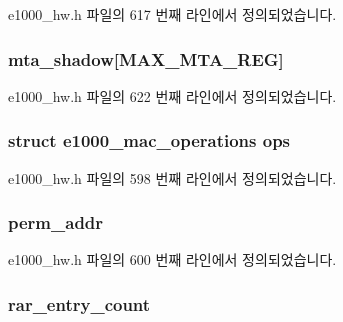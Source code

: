 e1000\+\_\+hw.\+h 파일의 617 번째 라인에서 정의되었습니다.

\subsubsection[{\texorpdfstring{mta\+\_\+shadow}{mta_shadow}}]{ mta\+\_\+shadow\mbox{[}M\+A\+X\+\_\+\+M\+T\+A\+\_\+\+R\+EG\mbox{]}}\hypertarget{structe1000__mac__info_a7eddddd2f2ff33f5b2b76183f09134df}{}\label{structe1000__mac__info_a7eddddd2f2ff33f5b2b76183f09134df}


e1000\+\_\+hw.\+h 파일의 622 번째 라인에서 정의되었습니다.

\subsubsection[{\texorpdfstring{ops}{ops}}]{\setlength{\rightskip}{0pt plus 5cm}struct {\bf e1000\+\_\+mac\+\_\+operations} ops}\hypertarget{structe1000__mac__info_a6ac57b9c85404edae44f08fe43d7ff02}{}\label{structe1000__mac__info_a6ac57b9c85404edae44f08fe43d7ff02}


e1000\+\_\+hw.\+h 파일의 598 번째 라인에서 정의되었습니다.

\subsubsection[{\texorpdfstring{perm\+\_\+addr}{perm_addr}}]{ perm\+\_\+addr}\hypertarget{structe1000__mac__info_a3d29a6a963467666bcb77c7e0b40fbf8}{}\label{structe1000__mac__info_a3d29a6a963467666bcb77c7e0b40fbf8}


e1000\+\_\+hw.\+h 파일의 600 번째 라인에서 정의되었습니다.

\subsubsection[{\texorpdfstring{rar\+\_\+entry\+\_\+count}{rar_entry_count}}]{ rar\+\_\+entry\+\_\+count}\hypertarget{structe1000__mac__info_a15c5f7ae3e42f602b075822136f53238}{}\label{structe1000__mac__info_a15c5f7ae3e42f602b075822136f53238}


